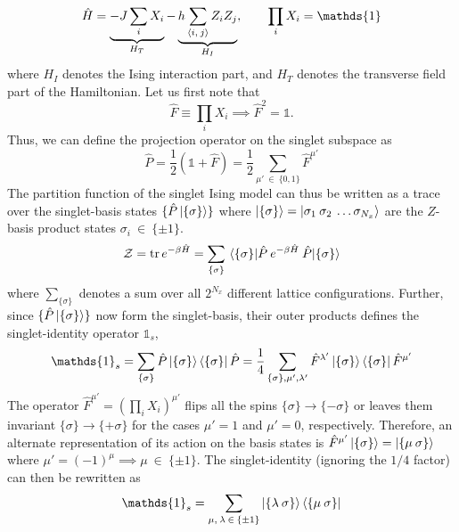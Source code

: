 \documentclass[../thesis_main.tex]{subfiles}
\begin{document}
\begin{equation}
    \hat{H} = \underbrace{-J \sum_i X_i}_{H_T} - \underbrace{h \sum_{\expval{i, \:j}} Z_{i} Z_{j}}_{H_I}, \qquad \prod_i X_i = \mathds{1}
\end{equation} 
where $H_I$ denotes the Ising interaction part, and $H_T$ denotes the transverse field part of the Hamiltonian. Let us first note that
\begin{equation}
    \hat{F} \equiv \prod_i X_i \implies \hat{F}^2 = \mathds{1}.
    \label{flipoperator}
\end{equation}  
Thus, we can define the projection operator on the singlet subspace as
\begin{equation}
    \hat{P} = \frac{1}{2}(\mathds{1} + \hat{F}) = \frac{1}{2} \sum_{\mu' \: \in \: \{0, 1\}} \hat{F}^{\mu'}
\end{equation}
The partition function of the singlet Ising model can thus be written as a trace over the singlet-basis states $\{\hat{P} \ket{\{\sigma\}} \}$ where $\ket{\{\sigma\}} = \ket{\sigma_1 \: \sigma_2 \: \ldots \sigma_{N_x}}$ are the $Z$-basis product states $\sigma_i \: \in \: \{\pm 1\}$.
\begin{equation}
    \mathcal{Z} = \tr e^{-\beta \hat{H}} = \sum_{\{\sigma\}} \mel{\{\sigma\}}{\hat{P} \: e^{-\beta \hat{H}} \: \hat{P}}{\{\sigma\}}
\end{equation}
where $\sum_{\{\sigma\}}$ denotes a sum over all $2^{N_x}$ different lattice configurations. Further, since $\{\hat{P} \ket{\{\sigma\}} \}$ now form the singlet-basis, their outer products defines the singlet-identity operator $\mathds{1}_s$,
\begin{equation}
    \mathds{1}_s = \sum_{\{\sigma\}} \hat{P} \ket{\{\sigma\}} \bra{\{\sigma\}} \hat{P} = \frac{1}{4} \sum_{\{\sigma\}, \mu', \lambda'} \hat{F}^{\lambda'} \ket{\{\sigma\}} \bra{\{\sigma\}} \hat{F}^{\mu'}  
\end{equation}
The operator $\hat{F}^{\mu'} = (\prod_i X_i)^{\mu'}$ flips all the spins $\{\sigma\} \longrightarrow \{-\sigma\}$ or leaves them invariant $\{\sigma\} \longrightarrow \{+\sigma\}$ for the cases ${\mu'} = 1$ and ${\mu'} = 0$, respectively. Therefore, an alternate representation of its action on the basis states is $\hat{F}^{\mu'} \ket{\{\sigma\}} = \ket{\{\mu \: \sigma\}}$ where $\mu'= (-1)^{\mu} \implies \mu \: \in \: \{\pm 1\}$. The singlet-identity (ignoring the $1/4$ factor) can then be rewritten as
\begin{equation}
    \mathds{1}_s = \sum_{\mu, \:\lambda \: \in \: \{\pm 1\}} \ket{\{\lambda \: \sigma\}} \bra{\{\mu \: \sigma\}}
\end{equation}
\end{document}
